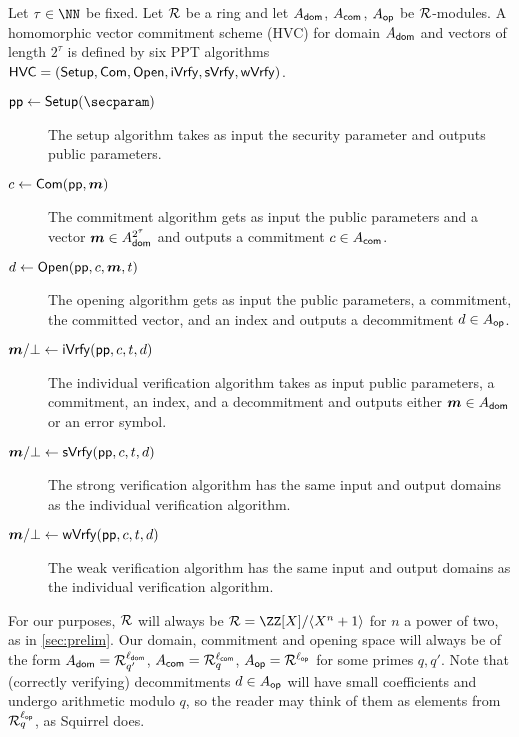 \begin{definition}\label{def:hvc}
Let $\tau\in\NN$ be fixed.
  Let $\mathcal{R}$ be a ring and let $A_{\mathsf{dom}}$, $A_{\mathsf{com}}$, $A_{\mathsf{op}}$ be $\mathcal{R}$-modules. %
  A homomorphic vector commitment scheme (HVC) for domain $A_{\mathsf{dom}}$ and vectors of length $2^\tau$ is defined by six PPT algorithms $\mathsf{HVC}=(\mathsf{Setup},\mathsf{Com},\allowbreak\mathsf{Open},\mathsf{iVrfy},\mathsf{sVrfy}, \mathsf{wVrfy})$.
\begin{description}
    \item[$\params\gets\setup(\secparam)$] The setup algorithm takes as input the security parameter and outputs public parameters.
    \item[$c \gets \mathsf{Com}(\mathsf{pp},\boldsymbol{m})$] The commitment algorithm gets as input the public parameters and a vector $\boldsymbol{m}\in A_{\mathsf{dom}}^{2^\tau}$ and outputs a commitment $c\in A_{\mathsf{com}}$.
    \item[$d \gets \mathsf{Open}(\mathsf{pp},c,\boldsymbol{m},t)$] The opening algorithm gets as input the public parameters, a commitment, the committed vector, and an index and outputs a decommitment $d\in A_{\mathsf{op}}$.
    \item[$\boldsymbol{m}/\bot\gets \mathsf{iVrfy}(\mathsf{pp},c,t,d)$] The individual verification algorithm takes as input public parameters, a commitment, an index, and a decommitment and outputs either $\boldsymbol{m}\in A_{\mathsf{dom}}$ or an error symbol.
    \item[$\boldsymbol{m}/\bot\gets \mathsf{sVrfy}(\mathsf{pp},c,t,d)$] The strong verification algorithm has the same input and output domains as the individual verification algorithm.
    \item[$\boldsymbol{m}/\bot\gets \mathsf{wVrfy}(\mathsf{pp},c,t,d)$] The weak verification algorithm has the same input and output domains as the individual verification algorithm.
  \end{description}
\end{definition}
For our purposes, $\mathcal{R}$ will always be $\ring = \defring$ for $n$ a power of two, as in \autoref{sec:prelim}.
Our domain, commitment and opening space will always be of the form $A_{\mathsf{dom}} = \mathcal{R}_{q'}^{\ell_{\mathsf{dom}}}$, $A_{\mathsf{com}} = \mathcal{R}_q^{\ell_{\mathsf{com}}}$, $A_{\mathsf{op}} = \mathcal{R}^{\ell_{\mathsf{op}}}$ for some primes $q,q'$.
Note that (correctly verifying) decommitments $d\in A_{\mathsf{op}}$ will have small coefficients and undergo arithmetic modulo $q$, so the reader may think of them as elements from $\mathcal{R}_q^{\ell_{\mathsf{op}}}$, as Squirrel \cite{CCS:FleSimZha22} does.

